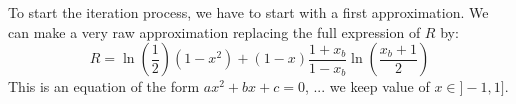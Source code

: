     To start the iteration process, we have to start with a first approximation.
    We can make a very raw approximation replacing the full expression of $R$ by:
    \begin{equation}
      R = \ln(\frac{1}{2})(1 - x^2) + (1 - x) \frac{1 + x_b}{1 - x_b}\ln(\frac{x_b+1}{2})
    \end{equation}
    This is an equation of the form $a x^2 + b x + c = 0$, ... we keep value of $x \in ]-1, 1]$.
